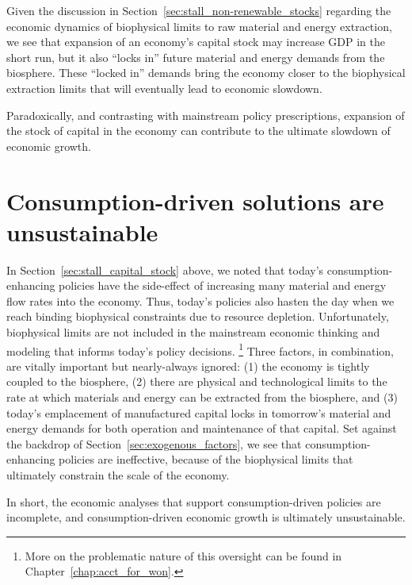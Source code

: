 Given the discussion in Section~\ref{sec:stall_non-renewable_stocks}
regarding the economic dynamics 
of biophysical limits to raw material and energy extraction,
we see that expansion of an economy's capital stock may increase GDP
in the short run, 
but it also ``locks in'' 
future material and energy demands 
from the biosphere.
These ``locked in'' demands bring the economy closer 
to the biophysical extraction limits 
that will eventually lead to economic slowdown.

\begin{svgraybox}
	Paradoxically, and contrasting with mainstream policy prescriptions,
	expansion of the stock of capital in the economy
	can contribute to the ultimate slowdown of economic growth.
\end{svgraybox}


\section{Consumption-driven solutions are unsustainable}
\label{sec:consumption_unsustainable}

In Section~\ref{sec:stall_capital_stock} above, 
we noted that today's consumption-enhancing policies have the side-effect of
increasing many material and energy flow rates into the economy.
Thus, today's policies also
hasten the day when we reach binding biophysical constraints
due to resource depletion. 
Unfortunately, biophysical limits 
are not included in the mainstream economic thinking and modeling
that informs today's policy decisions.%
	\footnote{
	More on the problematic nature of this oversight
	can be found in Chapter~\ref{chap:acct_for_won}.
	}
Three factors, in combination, are vitally important 
but nearly-always ignored: 
(1) the economy is tightly coupled to the biosphere, 
(2) there are physical and technological limits 
	to the rate at which materials and energy can be extracted 
	from the biosphere, and 
(3) today's emplacement of manufactured capital locks in
	tomorrow's material and energy demands 
	for both operation and maintenance of that capital.
Set against the backdrop of Section~\ref{sec:exogenous_factors},
we see that consumption-enhancing policies are ineffective,
because of the biophysical limits that ultimately constrain the scale of the economy. 

In short, the economic analyses that support 
consumption-driven policies are incomplete, and 
consumption-driven economic growth is ultimately unsustainable.


